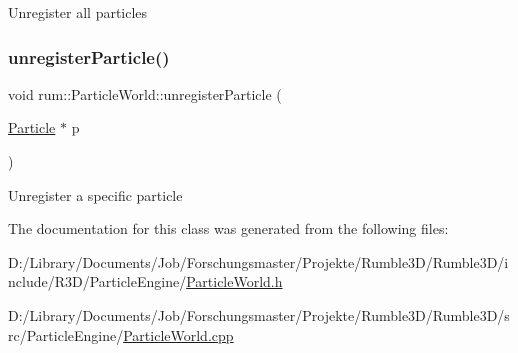 Unregister all particles \mbox{\label{classrum_1_1_particle_world_a7d8603a33bd5b2eb5120e45d9322ba4d}} 
\subsubsection{\texorpdfstring{unregister\+Particle()}{unregisterParticle()}}
{\footnotesize\ttfamily void rum\+::\+Particle\+World\+::unregister\+Particle (\begin{DoxyParamCaption}\item[{\mbox{\hyperlink{classrum_1_1_particle}{Particle}} $\ast$}]{p }\end{DoxyParamCaption})}

Unregister a specific particle 

The documentation for this class was generated from the following files\+:\begin{DoxyCompactItemize}
\item 
D\+:/\+Library/\+Documents/\+Job/\+Forschungsmaster/\+Projekte/\+Rumble3\+D/\+Rumble3\+D/include/\+R3\+D/\+Particle\+Engine/\mbox{\hyperlink{_particle_world_8h}{Particle\+World.\+h}}\item 
D\+:/\+Library/\+Documents/\+Job/\+Forschungsmaster/\+Projekte/\+Rumble3\+D/\+Rumble3\+D/src/\+Particle\+Engine/\mbox{\hyperlink{_particle_world_8cpp}{Particle\+World.\+cpp}}\end{DoxyCompactItemize}
